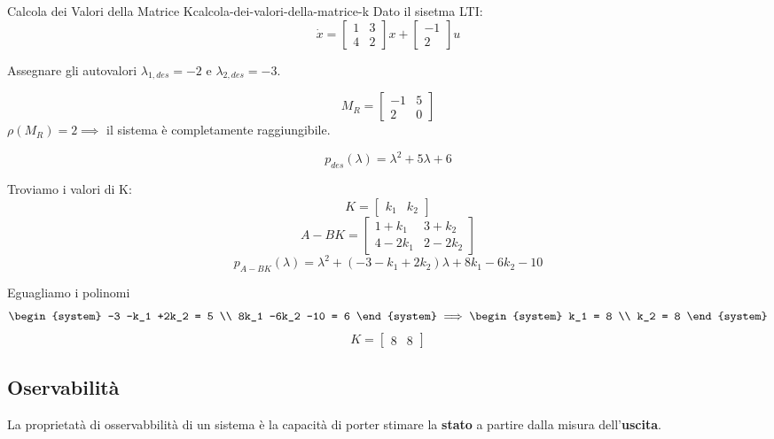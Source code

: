 \documentclass[12pt]{article}
\begin{document}
\begin{example}{Calcola dei Valori della Matrice K}{calcola-dei-valori-della-matrice-k}
    Dato il sisetma LTI:
    \[ \dot{x} = \begin{bmatrix} 1 & 3 \\ 4 & 2 \end{bmatrix}x + \begin{bmatrix} -1 \\ 2 \end{bmatrix} u  \]
    
    Assegnare gli autovalori $\lambda _{1,des} = -2$ e $\lambda _{2,des} = -3$.

    \[ M_R = \begin{bmatrix} -1 & 5 \\ 2 & 0 \end{bmatrix}  \]
    $\rho(M_R) = 2 \implies $ il sistema \`e completamente raggiungibile.

    \[ p _{des}(\lambda) = \lambda ^{2} + 5\lambda + 6 \]

    Troviamo i valori di K:
    \[ K = \begin{bmatrix} k_1 & k_2 \end{bmatrix}  \]
    \[ A-BK = \begin{bmatrix} 1+k_1 & 3+k_2 \\ 4-2k_1 & 2-2k_2 \end{bmatrix}  \]
    \[ p _{A-BK}(\lambda) = \lambda^{2} + (-3 -k_1 +2k_2)\lambda + 8k_1 -6k_2 -10 \]

    Eguagliamo i polinomi
    \[ \begin{system} 
        -3 -k_1 +2k_2 = 5 \\
        8k_1 -6k_2 -10  = 6
    \end{system}  \implies \begin{system} 
        k_1 = 8 \\
        k_2 = 8
    \end{system}  \]
    \[ \boxed{K = \begin{bmatrix} 8 & 8 \end{bmatrix} } \]
\end{example}


\subsection{Oservabilit\`a}
La proprietat\`a di osservabbilit\`a di un sistema \`e la capacit\`a di porter stimare la \textbf{stato} a partire dalla misura dell'\textbf{uscita}.
\end{document}
